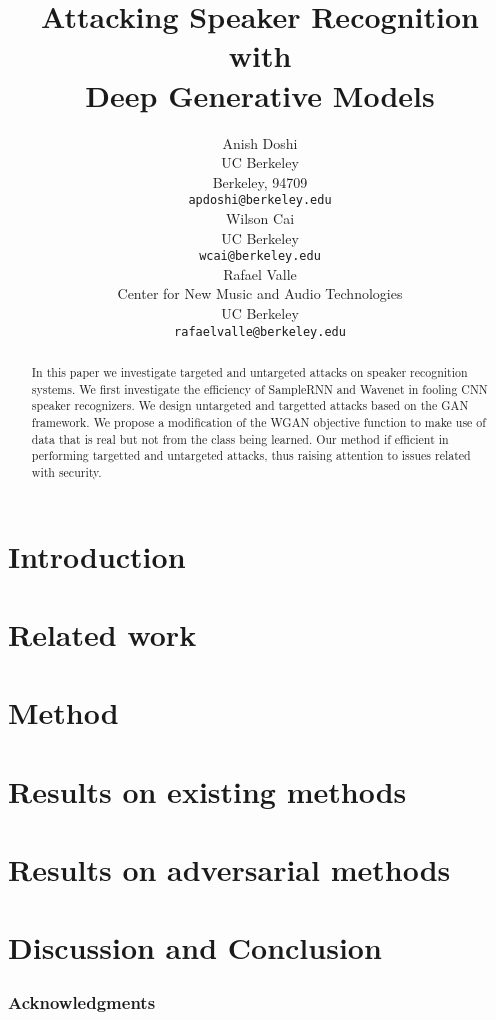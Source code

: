 \documentclass{article}
\title{Attacking Speaker Recognition with \\Deep Generative Models}
\author{
  Anish Doshi \\
  UC Berkeley \\
  Berkeley, 94709 \\
  \texttt{apdoshi@berkeley.edu} \\
  \And
  Wilson Cai\\
  UC Berkeley\\
  \texttt{wcai@berkeley.edu} \\
  \And
  Rafael Valle \\
  Center for New Music and Audio Technologies \\
  UC Berkeley\\
  \texttt{rafaelvalle@berkeley.edu} \\
}
\begin{document}

\maketitle

\begin{abstract}
    In this paper we investigate targeted and untargeted attacks on speaker
    recognition systems. We first investigate the efficiency of SampleRNN 
    and Wavenet in fooling CNN speaker recognizers. We design
    untargeted and targetted attacks based on the GAN framework. We propose  
    a modification of the WGAN objective function to make use of data that is 
    real but not from the class being learned. Our method if efficient in 
    performing targetted and untargeted attacks, thus raising attention to
    issues related with security. 
\end{abstract}

\theoremseparator{:}
\newtheorem{hyp}{Hypothesis}

\section{Introduction} \label{sec:introduction}

%
\section{Related work}\label{sec:related_work}

%
\section{Method}\label{sec:method}

%
\section{Results on existing methods}\label{sec:res_existing}

%
\section{Results on adversarial methods}\label{sec:res_adversarial}

%
\section{Discussion and Conclusion}\label{sec:conclusions}

%

\subsubsection*{Acknowledgments}




\end{document}
